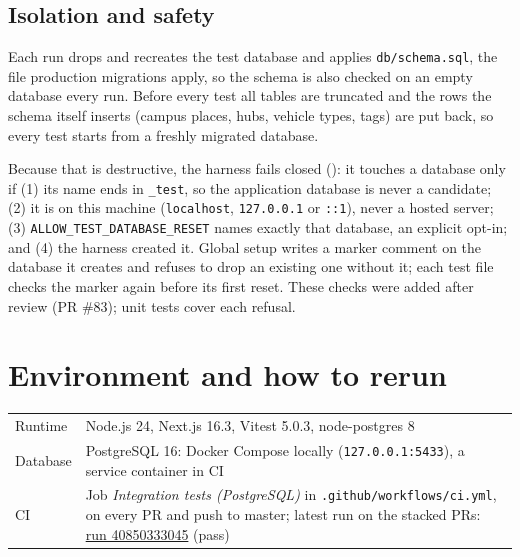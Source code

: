 \documentclass[10pt]{article}
\begin{document}
\subsection{Isolation and safety}
Each run drops and recreates the test database and applies \texttt{db/schema.sql}, the file
production migrations apply, so the schema is also checked on an empty database every run. Before
every test all tables are truncated and the rows the schema itself inserts (campus places, hubs,
vehicle types, tags) are put back, so every test starts from a freshly migrated database.

Because that is destructive, the harness fails closed ():
it touches a database only if (1) its name ends in \texttt{\_test}, so the application database
is never a candidate; (2) it is on this machine (\texttt{localhost}, \texttt{127.0.0.1} or
\texttt{::1}), never a hosted server; (3) \texttt{ALLOW\_TEST\_DATABASE\_RESET} names exactly that
database, an explicit opt-in; and (4) the harness created it. Global setup writes a marker comment
on the database it creates and refuses to drop an existing one without it; each test file checks
the marker again before its first reset. These checks were added after review (PR \#83); unit
tests cover each refusal.

\section{Environment and how to rerun}
\begin{tabularx}{\linewidth}{@{}lX@{}}
\toprule
Runtime & Node.js 24, Next.js 16.3, Vitest 5.0.3, node-postgres 8 \\
Database & PostgreSQL 16: Docker Compose locally (\texttt{127.0.0.1:5433}), a service container in CI \\
CI & Job \textit{Integration tests (PostgreSQL)} in \texttt{.github/workflows/ci.yml}, on every PR
and push to master; latest run on the stacked PRs:
\href{https://github.com/CS455-Carpooling/Campus_Ridepooling_Automation/actions/runs/40850333045/job/123367913858}{run 40850333045} (pass) \\
\bottomrule
\end{tabularx}

\end{document}
